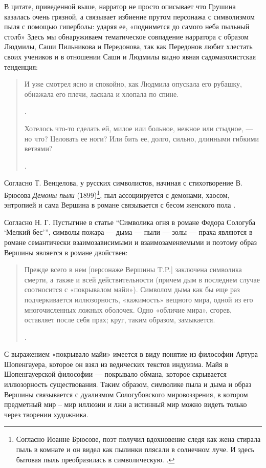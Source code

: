 \documentclass[12pt,a4paper]{article}
\begin{document}
В цитате, приведенной выше, нарратор не просто описывает что Грушина казалась очень грязной, а  связывает избиение прутом персонажа с символизмом пыля с помощью гиперболы: ударяя ее, «поднимется до самого неба пыльный столб» Здесь мы обнаруживаем тематическое совпадение нарратора с образом Людмилы, Саши Пильникова и Передонова, так как Передонов любит хлестать своих учеников и в отношении Саши и Людмилы видно явная садомазохистская тенденция:
\begin{quote}
И уже смотрел ясно и спокойно, как Людмила опускала его рубашку, обнажала его плечи, ласкала и хлопала по спине.

\parencite[208]{sologub2004}.

Хотелось что-то сделать ей, милое или больное, нежное или
стыдное, — но что? Целовать ее ноги? Или бить ее, долго, сильно, длинными гибкими ветвями?

\parencite[211]{sologub2004}.
\end{quote}

Согласно Т. Венцелова, у русских символистов, начиная с стихотворение В. Брюсова \emph{Демоны пыли} (1899)\footnote{ Согласно Иоанне Брюсове, поэт получил вдохновение следя как жена стирала пыль в комнате и он видел как пылинки плясали в солнечном луче. И здесь бытовая пыль преобразилась в символическую. \parencite[600]{brjusov1973}.}, пыл ассоциируется с демонами, хаосом, энтропией и сама Вершина в романе связывается с бесом женского пола \parencite[42--44]{venclova2012}. 

Согласно Н. Г. Пустыгине в статье \enquote{Символика огня в романе Федора Сологуба \enquote{Мелкий бес}}, символы пожара — дыма — пыли — золы — праха являются в романе семантически взаимозависимыми и взаимозаменяемыми и поэтому образ Вершины является в романе двойствен:

\begin{quote}
Прежде всего в нем [персонаже Вершины T.P.] заключена символика смерти, а также и всей действительности (причем дым в последнем случае соотносится с «покрывалом майи»). Символом дыма как бы еще раз подчеркивается иллюзорность, «кажимость» вещного мира, одной из его многочисленных ложных оболочек. Одно «обличие мира», сгорев, оставляет после себя прах; круг, таким образом, замыкается.

\parencite{pustygina1989}.
\end{quote}

С выражением «покрывало майи» имеется в виду понятие из философии Артура Шопенгауера, которое он взял из ведических текстов индуизма. Майя в Шопенгауерской философии — покрывало обмана, которое скрывается иллюзорность существования. Таким образом, символике пыла и дыма и образ Вершины связывается с дуализмом Сологубовского мировоззрения, в котором  предметный мир – мир иллюзии и лжи а истинный мир можно видеть только через творении художника.
\end{document}
